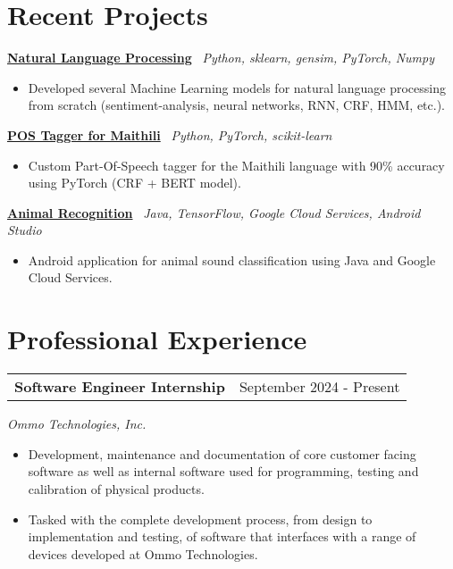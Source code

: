 \documentclass[a4paper,12pt]{article}
\begin{document}
\section{Recent Projects}

\href{https://github.com/kilibarda4/natural-language-processing}{\textbf{Natural Language Processing}} \ \textit{Python, sklearn, gensim, PyTorch, Numpy}
\begin{itemize}[leftmargin=*, nosep]
    \item Developed several Machine Learning models for natural language processing from scratch (sentiment-analysis, neural networks, RNN, CRF, HMM, etc.).
\end{itemize}

\href{https://github.com/kilibarda4/pos-tagger-Maithili}{\textbf{POS Tagger for Maithili}} \ \textit{Python, PyTorch, scikit-learn}
\begin{itemize}[leftmargin=*, nosep]
    \item Custom Part-Of-Speech tagger for the Maithili language with 90\% accuracy using PyTorch (CRF + BERT model).
\end{itemize}

\href{https://github.com/kilibarda4/animal-recognition-android}{\textbf{Animal Recognition}} \ \textit{Java, TensorFlow, Google Cloud Services, Android Studio}
\begin{itemize}[leftmargin=*, nosep]
    \item Android application for animal sound classification using Java and Google Cloud Services.
\end{itemize}
\section{Professional Experience}

\begin{tabularx}{\linewidth}{@{}Xr@{}}
\textbf{Software Engineer Internship} & \hfill September 2024 - Present
\end{tabularx}
\textit{Ommo Technologies, Inc.}
\begin{itemize}[leftmargin=*, nosep]
    \item Development, maintenance and documentation of core customer facing software as well as internal software used for programming, testing and calibration of physical products.
    \item Tasked with the complete development process, from design to implementation and testing, of software that interfaces with a range of devices developed at Ommo Technologies.
\end{itemize}
\end{document}
